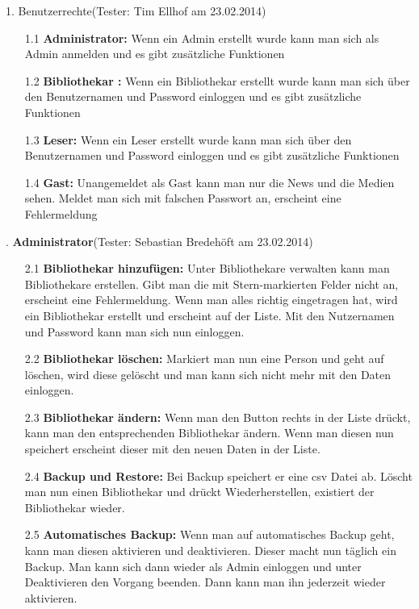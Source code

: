 \documentclass[fontsize=12pt,paper=a4,twoside]{scrartcl}
\begin{document}
1. Benutzerrechte(Tester: Tim Ellhof am 23.02.2014)\\
\begin{itemize}
\item[1.1]\textbf{Administrator:} Wenn ein Admin erstellt wurde kann man sich als Admin anmelden und es gibt zusätzliche Funktionen
\item[1.2]\textbf{Bibliothekar :} Wenn ein Bibliothekar erstellt wurde kann man sich über den Benutzernamen und Password einloggen und es gibt zusätzliche Funktionen
\item[1.3]\textbf{Leser:} Wenn ein Leser erstellt wurde kann man sich über den Benutzernamen und Password einloggen und es gibt zusätzliche Funktionen
\item[1.4]\textbf{Gast:} Unangemeldet als Gast kann man nur die News und die Medien sehen. Meldet man sich mit falschen Passwort an, erscheint eine Fehlermeldung
\end{itemize}
. \textbf{Administrator}(Tester: Sebastian Bredehöft am 23.02.2014)\\
\begin{itemize}
\item[2.1]\textbf{Bibliothekar hinzufügen:} Unter Bibliothekare verwalten kann man Bibliothekare erstellen. Gibt man die mit Stern-markierten Felder nicht an, erscheint eine Fehlermeldung. Wenn man alles richtig eingetragen hat, wird ein Bibliothekar erstellt und erscheint auf der Liste. Mit den Nutzernamen und Password kann man sich nun einloggen.
\item[2.2]\textbf{Bibliothekar löschen:} Markiert man nun eine Person und geht auf löschen, wird diese gelöscht und man kann sich nicht mehr mit den Daten einloggen.
\item[2.3]\textbf{Bibliothekar ändern:} Wenn man den Button rechts in der Liste drückt, kann man den entsprechenden Bibliothekar ändern. Wenn man diesen nun speichert erscheint dieser mit den neuen Daten in der Liste.
\item[2.4]\textbf{Backup und Restore:} Bei Backup speichert er eine csv Datei ab. Löscht man nun einen Bibliothekar und drückt Wiederherstellen, existiert der Bibliothekar wieder.
\item[2.5]\textbf{Automatisches Backup:} Wenn man auf automatisches Backup geht, kann man diesen aktivieren und deaktivieren. Dieser macht nun täglich ein Backup. Man kann sich dann wieder als Admin einloggen und unter Deaktivieren den Vorgang beenden. Dann kann man ihn jederzeit wieder aktivieren.
\end{itemize}
\end{document}
